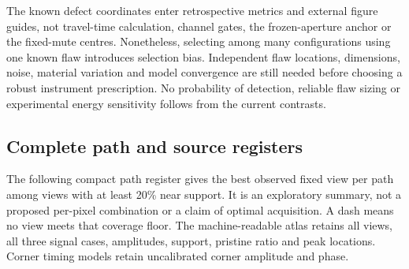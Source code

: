 \documentclass[11pt]{article}
\begin{document}
The known defect coordinates enter retrospective metrics and external figure guides, not travel-time calculation, channel gates, the frozen-aperture anchor or the fixed-mute centres. Nonetheless, selecting among many configurations using one known flaw introduces selection bias. Independent flaw locations, dimensions, noise, material variation and model convergence are still needed before choosing a robust instrument prescription. No probability of detection, reliable flaw sizing or experimental energy sensitivity follows from the current contrasts.

\subsection{Complete path and source registers}
The following compact path register gives the best observed fixed view per path among views with at least 20\% near support. It is an exploratory summary, not a proposed per-pixel combination or a claim of optimal acquisition. A dash means no view meets that coverage floor. The machine-readable atlas retains all views, all three signal cases, amplitudes, support, pristine ratio and peak locations. Corner timing models retain uncalibrated corner amplitude and phase.
\end{document}
